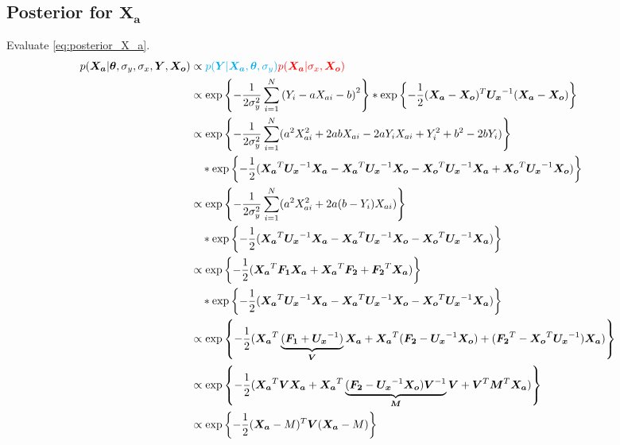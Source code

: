 \documentclass[10pt]{article}
\renewcommand{\vec}[1]{\boldsymbol{#1}}
\newcommand{\mat}[1]{\boldsymbol{#1}}
\begin{document}
\subsection{Posterior for $\vec{X_a}$}
Evaluate \cref{eq:posterior_X_a}.
\begin{align}
    p(\vec{X_a} | \vec{\theta}, \sigma_y, \sigma_x, \vec{Y}, \vec{X_o}) &\propto {\color{cyan} p(\vec{Y} | \vec{X_a}, \vec{\theta}, \sigma_y)} {\color{red} p(\vec{X_a} | \sigma_x, \vec{X_o})} \\
    &\propto \exp\left\{ - \frac{1}{2\sigma_y^2} \sum_{i=1}^N \left( Y_i - a X_{ai} - b \right)^2 \right\} * \exp\left\{ - \frac{1}{2} (\vec{X_a} - \vec{X_o})^T \mat{U_x}^{-1} (\vec{X_a} - \vec{X_o}) \right\} \\
    
    &\propto \exp\left\{ - \frac{1}{2\sigma_y^2} \sum_{i=1}^N (a^2 X_{ai}^2  + 2 a b X_{ai} - 2 a Y_i X_{ai} + Y_i^2 + b^2 -2 b Y_i) \right\} \nonumber \\
    &\quad * \exp\left\{ - \frac{1}{2} ( \vec{X_a}^T \mat{U_x}^{-1} \vec{X_a} - \vec{X_a}^T \mat{U_x}^{-1} \vec{X_o} -\vec{X_o}^T \mat{U_x}^{-1} \vec{X_a} + \vec{X_o}^T \mat{U_x}^{-1} \vec{X_o} ) \right\} \\
    
    &\propto \exp\left\{ - \frac{1}{2\sigma_y^2} \sum_{i=1}^N (a^2 X_{ai}^2  + 2 a (b - Y_i) X_{ai} ) \right\} \nonumber \\
    &\quad * \exp\left\{ - \frac{1}{2} ( \vec{X_a}^T \mat{U_x}^{-1} \vec{X_a} - \vec{X_a}^T \mat{U_x}^{-1} \vec{X_o} -\vec{X_o}^T \mat{U_x}^{-1} \vec{X_a}) \right\} \\
    
    &\propto \exp\left\{ - \frac{1}{2} (\vec{X_a}^T \mat{F_1} \vec{X_a} + \vec{X_a}^T \vec{F_2} + \vec{F_2}^T \vec{X_a}) \right\} \nonumber \\
    &\quad * \exp\left\{ - \frac{1}{2} ( \vec{X_a}^T \mat{U_x}^{-1} \vec{X_a} - \vec{X_a}^T \mat{U_x}^{-1} \vec{X_o} -\vec{X_o}^T \mat{U_x}^{-1} \vec{X_a}) \right\} \\
    
    &\propto \exp\left\{ - \frac{1}{2} (\vec{X_a}^T \underbrace{(\mat{F_1} + \mat{U_x}^{-1})}_{\mat{V}} \vec{X_a} + \vec{X_a}^T (\vec{F_2} - \mat{U_x}^{-1} \vec{X_o}) + (\vec{F_2}^T - \vec{X_o}^T \mat{U_x}^{-1}) \vec{X_a}) \right\} \\
    
    &\propto \exp\left\{ - \frac{1}{2} (\vec{X_a}^T \mat{V} \vec{X_a} + \vec{X_a}^T \underbrace{(\vec{F_2} - \mat{U_x}^{-1} \vec{X_o}) \mat{V}^{-1}}_{\vec{M}} \mat{V} + \mat{V}^T \vec{M}^T \vec{X_a}) \right\} \\
    
    &\propto \exp\left\{ - \frac{1}{2} (\vec{X_a} - M)^T \mat{V} (\vec{X_a} - M) \right\}

\end{align}
\end{document}
